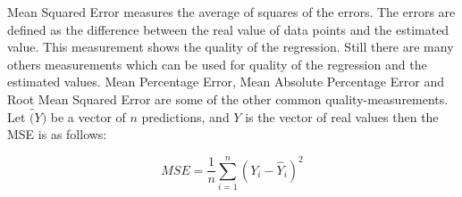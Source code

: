 Mean Squared Error measures the average of squares of the errors.
The errors are defined as the difference between the real value of data points and the estimated value.
This measurement shows the quality of the regression.
Still there are many others measurements which can be used for quality of the regression and the estimated values.
Mean Percentage Error,  Mean Absolute Percentage Error and Root Mean Squared Error are some of the other common quality-measurements.
Let $\hat(Y)$ be a vector of $n$ predictions, and $Y$ is the vector of real values then the MSE is as follows:

\begin{equation*}
  MSE= \frac{1}{n} \sum_{i=1}^{n}(Y_{i}-\hat{Y}_{i})^{2}
\end{equation*}
